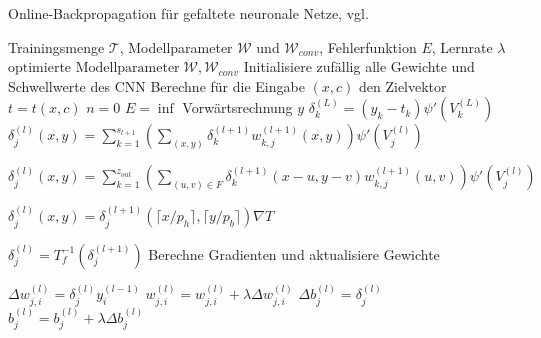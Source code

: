 \begin{algorithm}[H]
    \scriptsize
    \caption{Online-Backpropagation für gefaltete neuronale Netze, vgl. \cite{du_diss}}
    \label{alg:cnn_online}
    \begin{algorithmic}
    \Require  Trainingsmenge $\mathcal{T}$, Modellparameter $\mathcal{W}$ und $\mathcal{W}_{conv}$, Fehlerfunktion $E$, Lernrate $\lambda$ 
    \Ensure $\text{optimierte Modellparameter} \; \mathcal{W}, \mathcal{W}_{conv}$
    \State Initialisiere zufällig alle Gewichte und Schwellwerte des CNN 
    \State Berechne für die Eingabe $(x,c)$ den Zielvektor $t=t(x,c)$
    \State $n=0$  
    \State $E=\inf$
     
        \State Vorwärtsrechnung $y$
            \State $\delta_k^{(L)}=(y_k-t_k) \psi'(V^{(L)}_k)$
        \EndFor
                    \State $\delta_j^{(l)}(x,y)=\sum_{k=1}^{s_{l+1}} \left(\sum_{(x,y)} \delta_k^{(l+1)} w_{k,j}^{(l+1)}(x,y)\right) \psi'(V_j^{(l)})$
                    \EndIf

                    \State $\delta_j^{(l)}(x,y)=\sum_{k=1}^{z_{out}} \left(\sum_{(u,v) \in F} \delta_k^{(l+1)}(x-u,y-v) w_{k,j}^{(l+1)}(u,v)\right) \psi'(V_j^{(l)})$
                    \EndIf

                    \State $\delta_j^{(l)}(x,y)=\delta_j^{(l+1)}(\lceil x/p_h \rceil ,\lceil y/p_b \rceil) \nabla T$
                    \EndIf

                    \State $ \delta_j^{(l)}=T^{-1}_f(\delta_j^{(l+1)})$
                    \EndIf
                \EndFor
             \EndFor
        \EndFor 
        \State Berechne Gradienten und aktualisiere Gewichte

                        \State $\Delta w_{j,i}^{(l)}= \delta_j^{(l)} y^{(l-1)}_i$
                        \State $w^{(l)}_{j,i}= w^{(l)}_{j,i} + \lambda \Delta w_{j,i}^{(l)}$
                    \EndFor
                    \State $\Delta b^{(l)}_j=\delta^{(l)}_j$
                    \State $b^{(l)}_j=b^{(l)}_j + \lambda \Delta b^{(l)}_j$
                \EndFor
            \EndIf


\end{algorithmic}
\end{algorithm}
